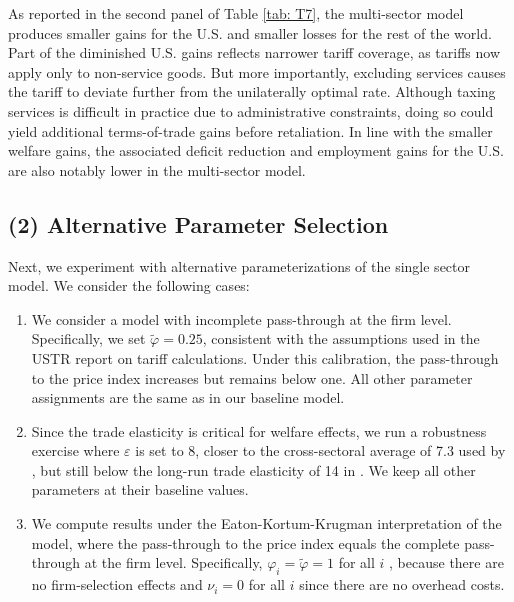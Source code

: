 \documentclass[12pt]{article}
\begin{document}
As reported in the second panel of Table \ref{tab: T7}, the multi-sector model produces smaller gains for the U.S. and smaller losses for the rest of the world. Part of the diminished U.S. gains reflects narrower tariff coverage, as tariffs now apply only to non-service goods. But more importantly, excluding services causes the tariff to deviate further from the unilaterally optimal rate. Although taxing services is difficult in practice due to administrative constraints, doing so could yield additional terms-of-trade gains before retaliation. In line with the smaller welfare gains, the associated deficit reduction and employment gains for the U.S. are also notably lower in the multi-sector model. 
\subsection*{(2) Alternative Parameter Selection}
Next, we experiment with alternative parameterizations of the single sector model. We consider the following cases:
\begin{enumerate}
    \item We consider a model with incomplete pass-through at the firm level. Specifically, we set $\tilde{\varphi} = 0.25$, consistent with the assumptions used in the USTR report on tariff calculations. Under this calibration, the pass-through to the price index increases but remains below one. All other parameter assignments are the same as in our baseline model.
\item Since the trade elasticity is critical for welfare effects, we run a robustness exercise where $\varepsilon$ is set to 8, closer to the cross-sectoral average of 7.3 used by \citet{CALIENDO_JIE_tariff}, but still below the long-run trade elasticity of 14 in \citet{alessandria2025recovering}. We keep all other parameters at their baseline values.
\item We compute results under the Eaton-Kortum-Krugman interpretation of the model, where the pass-through to the price index equals the complete pass-through at the firm level. Specifically, $\varphi_i = \tilde{\varphi} = 1$ for all $i$ , because there are no firm-selection effects and $\nu_i=0$  for all $i$ since there are no overhead costs.
\end{enumerate}
\end{document}
